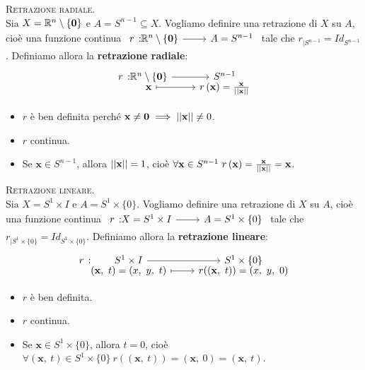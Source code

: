 \begin{example}\textsc{Retrazione radiale.}\label{retrazioneradiale}\\
	Sia $X=\mathbb{R}^n\setminus \left\{\mathbf{0}\right\}$ e $A=S^{n-1}\subseteq X$. Vogliamo definire una retrazione di $X$ su $A$, cioè una funzione continua $\funz{r}{\realset^n\setminus\left\{\mathbf{0}\right\}}{A=S^{n-1}}$ tale che $r_{\mid S^{n-1}}=Id_{S^{n-1}}$. Definiamo allora la \textbf{retrazione radiale}:
	\begin{equation}
		\funztot{r}{\realset^n\setminus\left\{\mathbf{0}\right\}}{S^{n-1}}{\mathbf{x}}{r\left(\mathbf{x}\right)=\frac{\mathbf{x}}{\labs \mathbf{x}\rabs}}
	\end{equation}
\begin{itemize}
	\item $r$ è ben definita perché $\mathbf{x}\neq\mathbf{0}\implies \left|\left| \mathbf{x}\right|\right|\neq 0$.
	\item $r$ continua.
	\item Se $\mathbf{x}\in S^{n-1}$, allora $\left|\left| \mathbf{x}\right|\right|=1$, cioè $\forall \mathbf{x}\in S^{n-1}\ r\left(\mathbf{x}\right)=\frac{\mathbf{x}}{\labs \mathbf{x}\rabs}=\mathbf{x}$.
\end{itemize}
\vspace{-3mm}
\end{example}
\begin{example}\textsc{Retrazione lineare.}\label{retrazionelineare}\\
	Sia $X=S^1\times I$ e $A=S^1\times \{0\}$. Vogliamo definire una retrazione di $X$ su $A$, cioè una funzione continua $\funz{r}{X=S^1\times I}{A=S^1\times \{0\}}$ tale che $r_{\mid S^1\times \{0\}}=Id_{S^1\times \{0\}}$. Definiamo allora la \textbf{retrazione lineare}:
	\begin{equation}
		\funztot{r}{S^1\times I}{S^{1}\times \{0\}}{(\mathbf{x},\ t)=(x,\ y,\ t)}{r((\mathbf{x},\ t))=(x,\ y,\ 0)}
	\end{equation}
	\begin{itemize}
		\item $r$ è ben definita.
		\item $r$ continua.
		\item Se $\mathbf{x}\in S^{1}\times \{0\}$, allora $t=0$, cioè $\forall \left(\mathbf{x},\ t\right)\in S^{1}\times \{0\}\ r\left(\left(\mathbf{x},\ t\right)\right)=\left(\mathbf{x},\ 0\right)=\left(\mathbf{x},\ t\right)$.
	\end{itemize}
	\vspace{-3mm}
\end{example}
